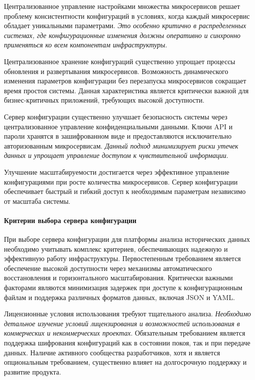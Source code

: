 Централизованное управление настройками множества микросервисов решает проблему консистентности конфигураций в условиях, когда каждый микросервис обладает уникальными параметрами. \textit{Это особенно критично в распределенных системах, где конфигурационные изменения должны оперативно и синхронно применяться ко всем компонентам инфраструктуры}.

Централизованное хранение конфигураций существенно упрощает процессы обновления и развертывания микросервисов.
Возможность динамического изменения параметров конфигурации без перезапуска микросервисов сокращает время простоя системы. Данная характеристика является критически важной для бизнес-критичных приложений, требующих высокой доступности.

Сервер конфигурации существенно улучшает безопасность системы через централизованное управление конфиденциальными данными.
Ключи API и пароли хранятся в зашифрованном виде и предоставляются исключительно авторизованным микросервисам. \textit{Данный подход минимизирует риски утечек данных и упрощает управление доступом к чувствительной информации}.

Улучшение масштабируемости достигается через эффективное управление конфигурациями при росте количества микросервисов. Сервер конфигурации обеспечивает быстрый и гибкий доступ к необходимым параметрам независимо от масштаба системы.

\paragraph{Критерии выбора сервера конфигурации}

При выборе сервера конфигурации для платформы анализа исторических данных необходимо учитывать комплекс критериев, обеспечивающих надежную и эффективную работу инфраструктуры.
Первостепенным требованием является обеспечение высокой доступности через механизмы автоматического восстановления и горизонтального масштабирования. Критически важными факторами являются минимизация задержек при доступе к конфигурационным файлам и поддержка различных форматов данных, включая JSON и YAML.

Лицензионные условия использования требуют тщательного анализа. \textit{Необходимо детальное изучение условий лицензирования и возможностей использования в коммерческих и некоммерческих проектах}.
Обязательным требованием является поддержка шифрования конфигураций как в состоянии покоя, так и при передаче данных. Наличие активного сообщества разработчиков, хотя и является опциональным требованием, существенно влияет на долгосрочную поддержку и развитие продукта.

